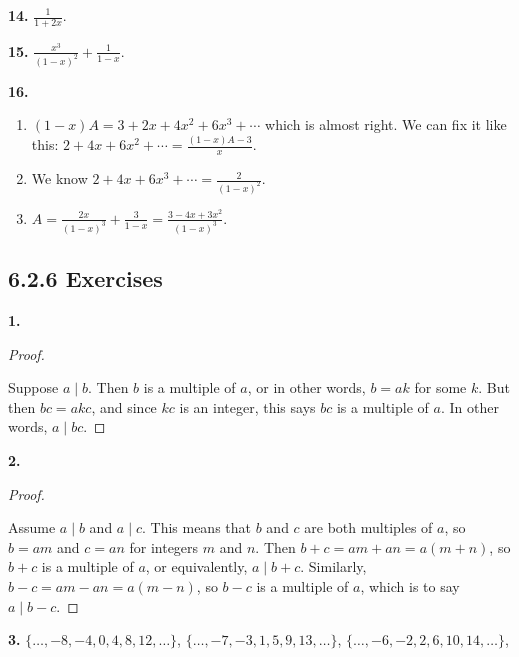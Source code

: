 \documentclass[10pt,]{book}
\theoremstyle{plain}
\theoremstyle{definition}
\theoremstyle{definition}
\theoremstyle{definition}
\numberwithin{equation}{chapter}
\begin{document}
\par\smallskip
\noindent\textbf{14.}\quad{}
\(\frac{1}{1+2x}\).
%
\par\smallskip
\noindent\textbf{15.}\quad{}
\(\frac{x^3}{(1-x)^2} + \frac{1}{1-x}\).
%
\par\smallskip
\noindent\textbf{16.}\quad{}\leavevmode%
\begin{enumerate}[label=(\alph*)]
\item\hypertarget{li-1367}{}\((1-x)A = 3 + 2x + 4x^2 + 6x^3 + \cdots\) which is almost right.  We can fix it like this:
		 \(2 + 4x + 6x^2 + \cdots = \frac{(1-x)A - 3}{x}\).%
\item\hypertarget{li-1368}{}
We know \(2 + 4x + 6x^3 + \cdots = \frac{2}{(1-x)^2}\).
%
\item\hypertarget{li-1369}{}\(A = \frac{2x}{(1-x)^3} + \frac{3}{1-x} = \frac{3 -4x + 3x^2}{(1-x)^3}\).%
\end{enumerate}
\par\smallskip
\subsection*{6.2.6 Exercises}
\noindent\textbf{1.}\quad{}\begin{proof}\hypertarget{proof-64}{}

Suppose \(a \mid b\). Then \(b\) is a multiple of \(a\), or in other words, \(b = ak\) for some \(k\). But then \(bc = akc\), and since \(kc\) is an integer, this says \(bc\) is a multiple of \(a\). In other words, \(a \mid bc\).
%
\end{proof}
\par\smallskip
\noindent\textbf{2.}\quad{}\begin{proof}\hypertarget{proof-65}{}

Assume \(a \mid b\) and \(a \mid c\). This means that \(b\) and \(c\) are both multiples of \(a\), so \(b = am\) and \(c = an\) for integers \(m\) and \(n\). Then \(b+c = am+an = a(m+n)\), so \(b+c\) is a multiple of \(a\), or equivalently, \(a \mid b+c\). Similarly, \(b-c = am-an = a(m-n)\), so \(b-c\) is a multiple of \(a\), which is to say \(a \mid b-c\).
%
\end{proof}
\par\smallskip
\noindent\textbf{3.}\quad{}
\(\{\ldots, -8, -4, 0, 4, 8, 12, \ldots\}\), \(\{\ldots, -7, -3, 1, 5, 9, 13, \ldots\}\), \(\{\ldots, -6, -2, 2, 6, 10, 14, \ldots\}\),
%
\par
\end{document}
